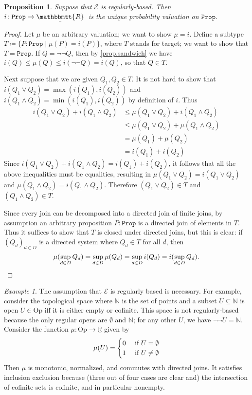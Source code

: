 \documentclass[11pt, oneside, article]{memoir}
\theoremstyle{plain}
\newtheorem{proposition}[theorem]{Proposition}
\theoremstyle{definition}
\theoremstyle{remark}
\newtheorem{example}[theorem]{Example}
\renewcommand{\ss}{\subseteq}
\newcommand{\const}[1]{\mathtt{#1}}
\newcommand{\Set}[1]{\mathrm{#1}}
\newcommand{\cat}[1]{\mathcal{#1}}
\newcommand{\tn}[1]{\textnormal{#1}}
\newcommand{\ul}[1]{\underline{#1}}
\newcommand{\ubar}[1]{\underaccent{\bar}{#1}}
\newcommand{\internal}[1]{\raisebox{-.03ex}{$\mathbbmtt{#1}$}}
\newcommand{\hs}{\hspace{1.1pt}}
\newcommand{\NN}{\mathbb{N}}
\newcommand{\LR}{\ul{\mathbb{R}}}
\newcommand{\tRR}{\internal{R}\hs}
\newcommand{\tLR}{\ubar{\tRR}\hs}
\newcommand{\Prop}{\const{Prop}}
\newcommand{\Op}{\Set{Op}}
\begin{document}
\begin{proposition}\label{prop.unique_probability_valuation_on_prop}
Suppose that $\cat{E}$ is regularly-based. Then $i\colon\Prop\to\tLR$ is the unique probability valuation on $\Prop$. 
\end{proposition}
\begin{proof}
Let $\mu$ be an arbitrary valuation; we want to show $\mu=i$. Define a subtype $T\coloneqq\{P:\Prop\mid\mu(P)=i(P)\}$, where $T$ stands for target; we want to show that $T=\Prop$. If $Q = \neg\neg Q$, then by \cref{prop.sandwich} we have $i(Q)\leq\mu(Q)\leq i(\neg\neg Q)=i(Q)$, so that $Q\in T$.

Next suppose that we are given $Q_1,Q_2\in T$. It is not hard to show that $i(Q_1\vee Q_2)=\max(i(Q_1),i(Q_2))$ and $i(Q_1\wedge Q_2)=\min(i(Q_1),i(Q_2))$ by definition of $i$. Thus
\begin{align*}
	i(Q_1\vee Q_2)+i(Q_1\wedge Q_2)
	&\leq\mu(Q_1\vee Q_2)+i(Q_1\wedge Q_2)\\
	&\leq \mu(Q_1\vee Q_2)+\mu(Q_1\wedge Q_2)\\
	&=\mu(Q_1)+\mu(Q_2)\\
	&=i(Q_1)+i(Q_2)
\end{align*}
Since $i(Q_1\vee Q_2)+i(Q_1\wedge Q_2)=i(Q_1)+i(Q_2)$, it follows that all the above inequalities must be equalities, resulting in $\mu(Q_1\vee Q_2)=i(Q_1\vee Q_2)$ and $\mu(Q_1\wedge Q_2) = i(Q_1\wedge Q_2)$. Therefore $(Q_1 \vee Q_2) \in T$ and $(Q_1\wedge Q_2)\in T$.

Since every join can be decomposed into a directed join of finite joins, by assumption an arbitrary proposition $P:\Prop$ is a directed join of elements in $T$. Thus it suffices to show that $T$ is closed under directed joins, but this is clear: if $(Q_d)_{d\in D}$ is a directed system where $Q_d\in T$ for all $d$, then
\[\mu(\sup_{d\in D}Q_d)=\sup_{d\in D}\mu(Q_d)=\sup_{d\in D} i(Q_d)=i(\sup_{d\in D}Q_d).\qedhere\]
\end{proof}

\begin{example}
The assumption that $\cat{E}$ is regularly based is necessary. For example, consider the topological space where $\NN$ is the set of points and a subset $U\ss\NN$ is open $U\in \Op$ iff it is either empty or cofinite. This space is not regularly-based because the only regular opens are $\emptyset$ and $\NN$; for any other $U$, we have $\neg\neg U=\NN$. Consider the function $\mu\colon\Op\to\LR$ given by
\[\mu(U)=\begin{cases}0&\tn{ if }U=\emptyset\\1&\tn{ if }U\neq\emptyset\end{cases}\]
Then $\mu$ is monotonic, normalized, and commutes with directed joins. It satisfies inclusion exclusion because (three out of four cases are clear and) the intersection of cofinite sets is cofinite, and in particular nonempty.
\end{example}
\end{document}
